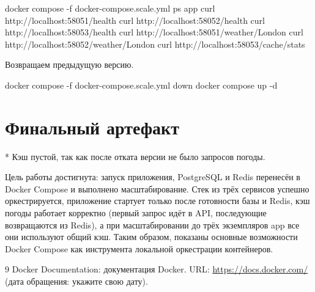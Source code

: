\begin{code}
docker compose -f docker-compose.scale.yml ps app
curl http://localhost:58051/health
curl http://localhost:58052/health
curl http://localhost:58053/health
curl http://localhost:58051/weather/London
curl http://localhost:58052/weather/London
curl http://localhost:58053/cache/stats
\end{code}


Возвращаем предыдущую версию.

\begin{code}
docker compose -f docker-compose.scale.yml down
docker compose up -d
\end{code}

\section{Финальный артефакт}


* Кэш пустой, так как после отката версии не было запросов погоды.


Цель работы достигнута: запуск приложения, PostgreSQL и Redis перенесён в Docker Compose и выполнено масштабирование. Стек из трёх сервисов успешно оркестрируется, приложение стартует только после готовности базы и Redis, кэш погоды работает корректно (первый запрос идёт в API, последующие возвращаются из Redis), а при масштабировании до трёх экземпляров app все они используют общий кэш. Таким образом, показаны основные возможности Docker Compose как инструмента локальной оркестрации контейнеров.

\begin{thebibliography}{9}
  Docker Documentation: документация Docker.
  URL: \url{https://docs.docker.com/}
  (дата обращения: укажите свою дату).
\end{thebibliography}
